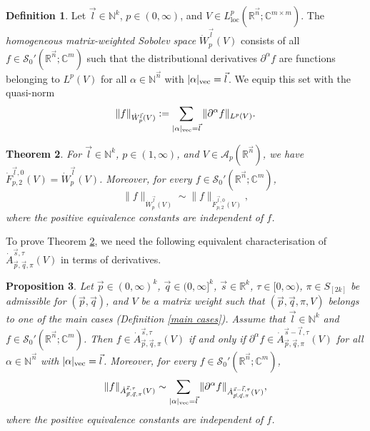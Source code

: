 \documentclass[11pt, reqno]{amsart}
\newtheorem{theorem}{Theorem}[section]
\newtheorem{proposition}[theorem]{Proposition}
\theoremstyle{definition}
\newtheorem{definition}[theorem]{Definition}
\theoremstyle{remark}
\numberwithin{equation}{section}
\newcommand{\A}{\mathscr A}
\newcommand{\C}{\mathbb C}
\newcommand{\N}{\mathbb N}
\newcommand{\R}{\mathbb R}
\newcommand{\Sc}{\mathscr S}
\newcommand{\vn}{\vec n}
\newcommand{\vp}{\vec p}
\newcommand{\vq}{\vec q}
\newcommand{\vs}{\vec s}
\newcommand{\Atau}{\dot A^{\vs,\tau}_{\vp,\vq,\pi}}
\newcommand{\loc}{\mathrm{loc}}
\newcommand{\Norm}[2]{\|#1\|_{#2}}
\begin{document}
\begin{definition}
Let $\vec l\in\mathbb N^k$, $p\in(0,\infty)$,
and $V\in L_{\loc}^p(\R^{\vec n};\C^{m\times m})$.
The \emph{homogeneous matrix-weighted Sobolev space} $\dot W^{\vec l}_p(V)$
consists of all $f\in\Sc_0'(\R^{\vn};\C^m)$ such that
the distributional derivatives $\partial^{\alpha} f$
are functions belonging to $L^p(V)$
for all $\alpha\in \mathbb N^{\vec n}$ with $|\alpha|_{\rm{vec}}= \vec l$.
We equip this set with the quasi-norm
\begin{equation}\label{def Sobo}
\|f\|_{\dot W^{\vec l}_p(V)}
:=\sum_{|\alpha|_{\rm{vec}}=\vec l} \|\partial^{\alpha} f\|_{L^p(V)}.
\end{equation}
\end{definition}

\begin{theorem}\label{thm:Sobolev}
For $\vec l\in\N^k$, $p\in(1,\infty)$, and $V\in \A_p(\mathbb R^{\vec n})$,
we have $\dot F^{\vec l,0}_{p,2}(V)=\dot W^{\vec l}_p(V)$.
Moreover, for every $f\in\Sc_0'(\R^{\vn};\C^m)$,
\begin{equation*}
\Norm{f}{\dot W^{\vec l}_p(V)}\sim\Norm{f}{\dot F^{\vec l,0}_{p,2}(V)},
\end{equation*}
where the positive equivalence constants are independent of $f$.
\end{theorem}

To prove Theorem \ref{thm:Sobolev}, we need the following equivalent characterisation of $\Atau(V)$ in terms of derivatives.

\begin{proposition} \label{partial derivative}
Let $\vp\in(0,\infty)^k$, $\vq\in(0,\infty]^k$, $\vs\in\R^k$,
$\tau\in[0,\infty)$, $\pi\in S_{[2k]}$ be admissible for $(\vp,\vq)$, and $V$ be a matrix weight such that $(\vp,\vq,\pi,V)$ belongs to one of the main cases (Definition \ref{main cases}).
Assume that $\vec l\in\mathbb N^k$ and $f\in \Sc_{0}'(\R^{\vn};\C^m)$.
Then $f\in\Atau(V)$ if and only if
$\partial^{\alpha} f\in \dot A_{\vec p,\vec q,\pi}^{\vec s-\vec l,\tau}(V)$
for all $\alpha\in\N^{\vn}$ with $|\alpha|_{\rm{vec}}=\vec l$.
Moreover, for every $f\in\Sc_0'(\R^{\vn};\C^m)$,
$$
\|f\|_{\Atau(V)}
\sim \sum_{|\alpha|_{\rm{vec}}=\vec l} \|\partial^{\alpha} f\|_{\dot A_{\vec p,\vec q,\pi}^{\vec s-\vec l,\tau}(V)},
$$
where the positive equivalence constants are independent of $f$.
\end{proposition}
\end{document}
